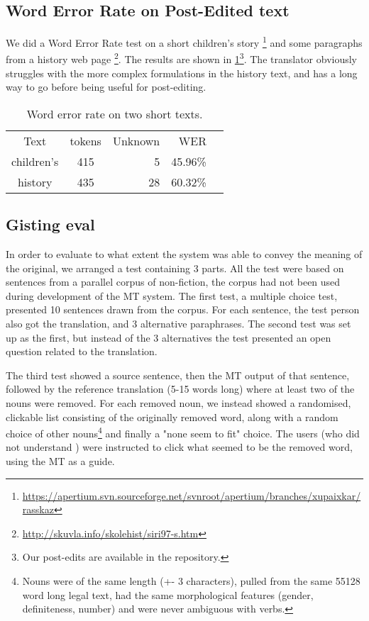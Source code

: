 \subsection{Word Error Rate on Post-Edited text}
\label{sec:WER}
We did a Word Error Rate test on a short children's story
\footnote{\href{https://apertium.svn.sourceforge.net/svnroot/apertium/branches/xupaixkar/rasskaz}{https://apertium.svn.sourceforge.net/svnroot/apertium/branches/xupaixkar/rasskaz}}
and some paragraphs from a history web page
\footnote{\href{http://skuvla.info/skolehist/siri97-s.htm}{http://skuvla.info/skolehist/siri97-s.htm}}.
The results are shown in \ref{table:wer}\footnote{Our post-edits are
  available in the repository.}. The translator obviously struggles
with the more complex formulations in the history text, and has a long
way to go before being useful for post-editing.


\begin{table}
  \begin{center}
  \begin{tabular}{ccrrr}
   Text       & tokens & Unknown & WER  \\
   children's & 415     & 5      & 45.96\% \\
   history    & 435     & 28     & 60.32\%  \\
  \end{tabular}
    \caption{Word error rate on two short texts.}
    \label{table:wer}
  \end{center}
\end{table}


\subsection{Gisting eval}
  
In order to evaluate to what extent the system was able to convey the
meaning of the original, we arranged a test containing 3 parts. All
the test were based on sentences from a parallel corpus of
non-fiction, the corpus had not been used during development of the MT
system. The first test, a multiple choice test, presented 10 sentences
drawn from the corpus. For each sentence, the test person also got the
translation, and 3 alternative paraphrases. The second test was set up
as the first, but instead of the 3 alternatives the test presented an
open question related to the translation.

The third test showed a \sme{} source sentence, then the MT output of
that sentence, followed by the reference translation (5-15 words long)
where at least two of the nouns were removed. For each removed noun,
we instead showed a randomised, clickable list consisting of the
originally removed word, along with a random choice of other
nouns\footnote{Nouns were of the same length (+- 3 characters), pulled
  from the same 55128 word long legal text, had the same morphological
  features (gender, definiteness, number) and were never ambiguous
  with verbs.} and finally a "none seem to fit" choice. The users (who
did not understand \sme{}) were instructed to click what seemed to be
the removed word, using the MT as a guide.

